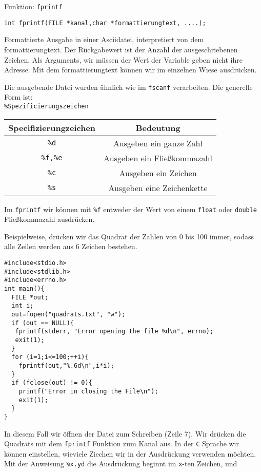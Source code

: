 \begin{myexampleblock}{Funktion: \texttt{fprintf}}
\begin{lstlisting}
int fprintf(FILE *kanal,char *formattierungtext, ....);
\end{lstlisting}
\vspace{-0.4cm}
Formattierte Ausgabe in einer Asciidatei, interpretiert von dem formattierungtext. Der Rückgabewert ist der
Anzahl der ausgeschriebenen Zeichen. Als Arguments, wir müssen der Wert der Variable geben
nicht ihre Adresse. Mit dem formattierungtext können wir im einzelnen Wiese ausdrücken.

Die ausgebende Datei wurden ähnlich wie im \texttt{fscanf} verarbeiten. Die generelle Form ist:\\
\texttt{\%Spezificierungszeichen}
{
\begin{center}
\begin{tabular}{|cc|}
\hline
Specifizierungzeichen & Bedeutung \\\hline
\texttt{\%d}   &  Ausgeben ein ganze Zahl \\
\texttt{\%f,\%e}   & Ausgeben ein Fließkommazahl  \\
\texttt{\%c}  & Ausgeben ein Zeichen  \\
\texttt{\%s}  & Ausgeben eine Zeichenkette\\
\hline
\end{tabular}
\end{center}
}
Im \texttt{fprintf} wir können mit \texttt{\%f} entweder der Wert von einem \texttt{float} oder \texttt{double} Fließkommazahl
ausdrücken.
\end{myexampleblock}
Beispielweise, drücken wir das Quadrat der Zahlen von 0 bis 100 immer, sodass alle Zeilen werden
aus 6 Zeichen bestehen.
\begin{lstlisting}
#include<stdio.h>
#include<stdlib.h>
#include<errno.h>
int main(){
  FILE *out;
  int i;
  out=fopen("quadrats.txt", "w");
  if (out == NULL){
   fprintf(stderr, "Error opening the file %d\n", errno);
   exit(1);
  }
  for (i=1;i<=100;++i){
    fprintf(out,"%.6d\n",i*i);
  }
  if (fclose(out) != 0){
    printf("Error in closing the File\n");
    exit(1);
  }
}
\end{lstlisting}
In diesem Fall wir öffnen der Datei zum Schreiben (Zeile 7). Wir drücken 
die Quadrats mit dem \texttt{fprintf} Funktion zum Kanal aus. In der \texttt{C} Sprache wir 
können einstellen, wieviele Ziechen wir in der Ausdrückung verwenden möchten. 
Mit der Anweisung \texttt{\%x.yd} die Ausdrückung beginnt im \texttt{x}-ten Zeichen, und 

